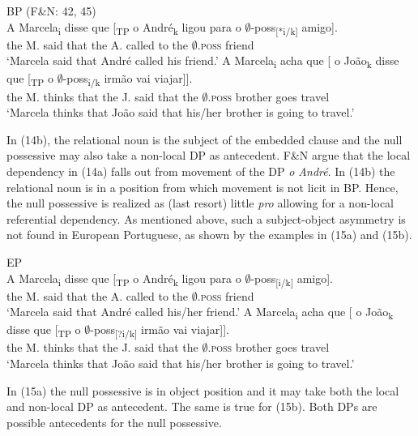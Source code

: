 \documentclass[output=paper]{langsci/langscibook}
\begin{document}
\ea%
    BP (F\&N: 42, 45)\label{ex:wein:14}\\
    \ea
    \gll A Marcela\textsubscript{i} disse que [\textsubscript{TP} o André\textsubscript{k} ligou para o $\emptyset$-poss\textsubscript{[}\textsubscript{*i/k]} amigo].\\
         the M. said that {} the A. called to the $\emptyset$\textsc{.poss} friend\\
    \glt ‘Marcela said that André called his friend.’
    \ex  
    \gll A Marcela\textsubscript{i} acha que [ o João\textsubscript{k} disse que [\textsubscript{TP} o $\emptyset$-poss\textsubscript{i/k} irmão vai viajar]].\\
         the M. thinks that {} the J. said that {} the $\emptyset$\textsc{.poss} brother goes travel\\
    \glt ‘Marcela thinks that João said that his/her brother is going to travel.’
    \z
\z

In (14b), the relational noun is the subject of the embedded clause and the null possessive may also take a non-local DP as antecedent. F\&N argue that the local dependency in (14a) falls out from movement of the DP \textit{o André}. In (14b) the relational noun is in a position from which movement is not licit in BP. Hence, the null possessive is realized as (last resort) little \textit{pro} allowing for a non-local referential dependency. As mentioned above, such a subject-object asymmetry is not found in European Portuguese, as shown by the examples in (15a) and (15b).

\ea%
    EP\label{ex:wein:15}\\
    \ea
    \gll A Marcela\textsubscript{i} disse que [\textsubscript{TP} o André\textsubscript{k} ligou para o $\emptyset$-poss\textsubscript{[}\textsubscript{i/k]} amigo].\\
         the M. said that {} the A. called to the $\emptyset$\textsc{.poss} friend\\
    \glt ‘Marcela said that André called his/her friend.’
    \ex  
    \gll A Marcela\textsubscript{i} acha que [ o João\textsubscript{k} disse que [\textsubscript{TP} o $\emptyset$-poss\textsubscript{[}\textsubscript{?i/k]} irmão vai viajar]].\\
         the M. thinks that {} the J. said that {} the $\emptyset$\textsc{.poss} brother goes travel\\
    \glt ‘Marcela thinks that João said that his/her brother is going to travel.’
    \z
\z

In (15a) the null possessive is in object position and it may take both the local and non-local DP as antecedent. The same is true for (15b). Both DPs are possible antecedents for the null possessive.
\end{document}
